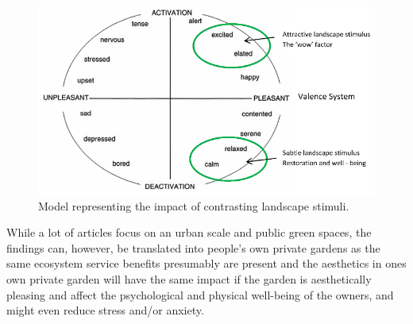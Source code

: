 	\begin{figure}[H]
		\centering
		\includegraphics[width=0.9\linewidth]{figure/Analysis/circomplexModel.png}
		\caption{Model representing the impact of contrasting landscape stimuli.\cite{wowFactor}}
		\label{fig:circumplexModel}
	\end{figure}
	
	While a lot of articles focus on an urban scale and public green spaces, the findings can, however, be translated into people's own private gardens as the same ecosystem service benefits presumably are present and the aesthetics in ones own private garden will have the same impact if the garden is aesthetically pleasing and affect the psychological and physical well-being of the owners, and might even reduce stress and/or anxiety\cite{humanResponsesToLandscapes}.
	
